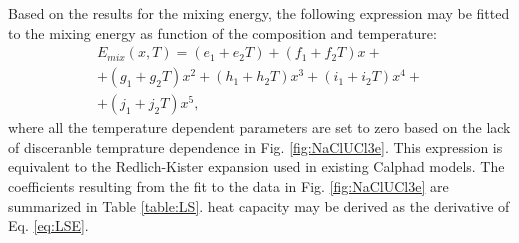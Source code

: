 \documentclass[preprint,3p,10pt,twocolumn,number,sort&compress]{elsarticle}
\begin{document}
Based on the results for the mixing energy, the following expression may be fitted to the mixing energy as function of the composition and temperature:
\begin{equation}
\begin{split}
E_{mix}(x,T)=(e_1+e_2T)+(f_1+f_2T)x+\\
+(g_1+g_2T)x^2+(h_1+h_2T)x^3+(i_1+i_2T)x^4+\\
+(j_1+j_2T)x^5,
\label{eq:LSE}
\end{split}
\end{equation}
where all the temperature dependent parameters are set to zero based on the lack of disceranble temprature dependence in Fig. \ref{fig:NaClUCl3e}. This expression is equivalent to the Redlich-Kister expansion used in existing Calphad models. The coefficients resulting from the fit to the data in Fig. \ref{fig:NaClUCl3e} are summarized in Table \ref{table:LS}. heat capacity may be derived as the derivative of Eq. \ref{eq:LSE}.
\end{document}
